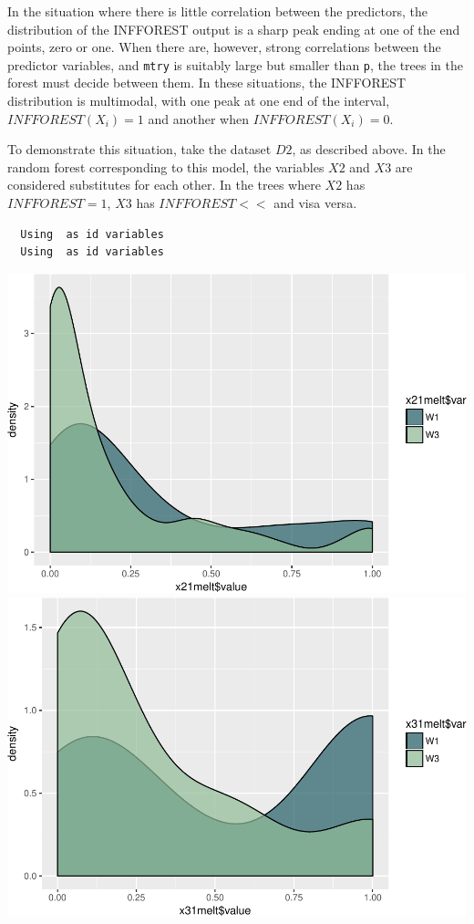 \documentclass[12pt,twoside]{reedthesis}
\begin{document}
  In the situation where there is little correlation between the
  predictors, the distribution of the INFFOREST output is a sharp peak
  ending at one of the end points, zero or one. When there are, however,
  strong correlations between the predictor variables, and \texttt{mtry}
  is suitably large but smaller than \texttt{p}, the trees in the forest
  must decide between them. In these situations, the INFFOREST
  distribution is multimodal, with one peak at one end of the interval,
  \(INFFOREST(X_i) = 1\) and another when \(INFFOREST(X_i) = 0\).
  
  To demonstrate this situation, take the dataset \(D2\), as described
  above. In the random forest corresponding to this model, the variables
  \(X2\) and \(X3\) are considered substitutes for each other. In the
  trees where \(X2\) has \(INFFOREST = 1\), \(X3\) has \(INFFOREST <<\)
  and visa versa.
  
  \begin{verbatim}
  Using  as id variables
  Using  as id variables
  \end{verbatim}
  
  \includegraphics{Thesis_files/figure-latex/figx2x1inf-1.pdf}
  \includegraphics{Thesis_files/figure-latex/figx2x1inf-2.pdf}
  
\end{document}
